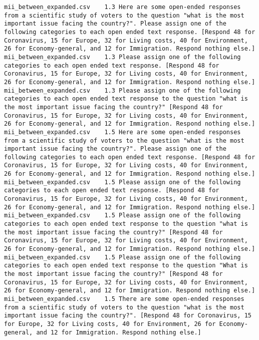 \begin{lstlisting}[label=lst:promptvariants]
mii_between_expanded.csv	1.3	Here are some open-ended responses from a scientific study of voters to the question "what is the most important issue facing the country?". Please assign one of the following categories to each open ended text response. [Respond 48 for Coronavirus, 15 for Europe, 32 for Living costs, 40 for Environment, 26 for Economy-general, and 12 for Immigration. Respond nothing else.]
mii_between_expanded.csv	1.3	Please assign one of the following categories to each open ended text response. [Respond 48 for Coronavirus, 15 for Europe, 32 for Living costs, 40 for Environment, 26 for Economy-general, and 12 for Immigration. Respond nothing else.]
mii_between_expanded.csv	1.3	Please assign one of the following categories to each open ended text response to the question "what is the most important issue facing the country?" [Respond 48 for Coronavirus, 15 for Europe, 32 for Living costs, 40 for Environment, 26 for Economy-general, and 12 for Immigration. Respond nothing else.]
mii_between_expanded.csv	1.5	Here are some open-ended responses from a scientific study of voters to the question "what is the most important issue facing the country?". Please assign one of the following categories to each open ended text response. [Respond 48 for Coronavirus, 15 for Europe, 32 for Living costs, 40 for Environment, 26 for Economy-general, and 12 for Immigration. Respond nothing else.]
mii_between_expanded.csv	1.5	Please assign one of the following categories to each open ended text response. [Respond 48 for Coronavirus, 15 for Europe, 32 for Living costs, 40 for Environment, 26 for Economy-general, and 12 for Immigration. Respond nothing else.]
mii_between_expanded.csv	1.5	Please assign one of the following categories to each open ended text response to the question "what is the most important issue facing the country?" [Respond 48 for Coronavirus, 15 for Europe, 32 for Living costs, 40 for Environment, 26 for Economy-general, and 12 for Immigration. Respond nothing else.]
mii_between_expanded.csv	1.5	Please assign one of the following categories to each open ended text response to the question "What is the most important issue facing the country?" [Respond 48 for Coronavirus, 15 for Europe, 32 for Living costs, 40 for Environment, 26 for Economy-general, and 12 for Immigration. Respond nothing else.]
mii_between_expanded.csv	1.5	There are some open-ended responses from a scientific study of voters to the question "what is the most important issue facing the country?". [Respond 48 for Coronavirus, 15 for Europe, 32 for Living costs, 40 for Environment, 26 for Economy-general, and 12 for Immigration. Respond nothing else.]

\end{lstlisting}
